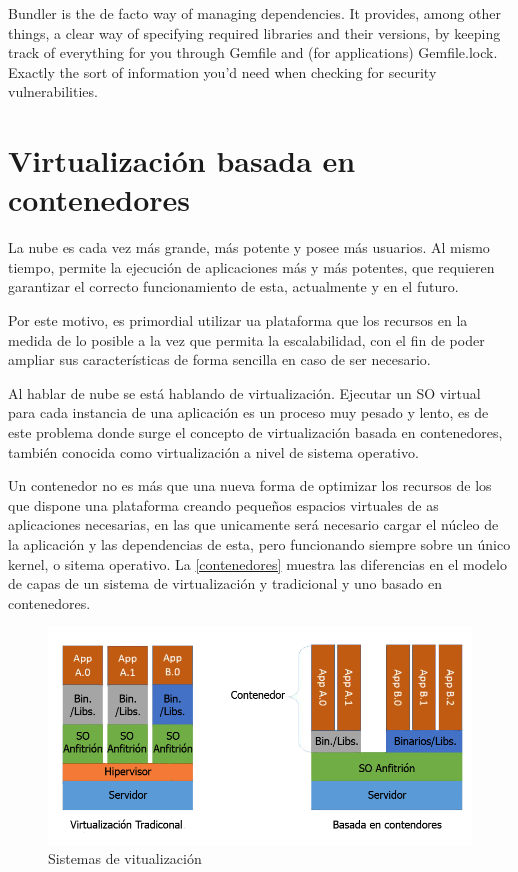 

Bundler is the de facto way of managing dependencies. It provides, among other things, a clear way of specifying required libraries and their versions, by keeping track of everything for you through Gemfile and (for applications) Gemfile.lock. Exactly the sort of information you’d need when checking for security vulnerabilities.

\section{Virtualización basada en contenedores}

La nube es cada vez más grande, más potente y posee más usuarios. Al mismo tiempo, permite la ejecución de aplicaciones más y más potentes, que requieren garantizar el correcto funcionamiento de esta, actualmente y en el futuro.

Por este motivo, es primordial utilizar ua plataforma que los recursos en la medida de lo posible a la vez que permita la escalabilidad, con el fin de poder ampliar sus características de forma sencilla en caso de ser necesario.

Al hablar de nube se está hablando de virtualización. Ejecutar un \gls{SO} virtual para cada instancia de una aplicación es un proceso muy pesado y lento, es de este problema donde surge el concepto de virtualización basada en contenedores, también conocida como virtualización a nivel de sistema operativo.

Un contenedor no es más que una nueva forma de optimizar los recursos de los que dispone una plataforma creando pequeños espacios virtuales de as aplicaciones necesarias, en las que unicamente será necesario cargar el núcleo de la aplicación y las dependencias de esta, pero funcionando siempre sobre un único kernel, o sitema operativo\cite{velazco2016}. La \autoref{contenedores} muestra las diferencias en el modelo de capas de un sistema de virtualización y tradicional y uno basado en contenedores.

\begin{figure}[htbp]
	\centering
	\includegraphics[width=0.8\linewidth]
	{tecnica/figuras/Contenedores.png}
	\caption{Sistemas de vitualización}
	\label{contenedores}
\end{figure}



\endinput